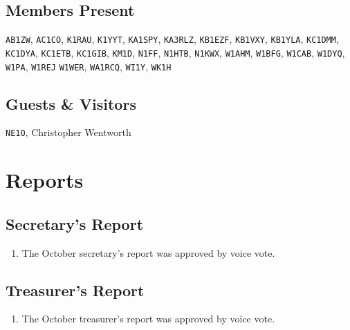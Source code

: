 \documentclass[10pt,letterpaper]{article}
\begin{document}
\subsection{Members Present}
\texttt{AB1ZW},
\texttt{AC1CO},
\texttt{K1RAU},
\texttt{K1YYT},
\texttt{KA1SPY},
\texttt{KA3RLZ},
\texttt{KB1EZF},
\texttt{KB1VXY},
\texttt{KB1YLA},
\texttt{KC1DMM},
\texttt{KC1DYA},
\texttt{KC1ETB},
\texttt{KC1GIB},
\texttt{KM1D},
\texttt{N1FF},
\texttt{N1HTB},
\texttt{N1KWX},
\texttt{W1AHM},
\texttt{W1BFG},
\texttt{W1CAB},
\texttt{W1DYQ},
\texttt{W1PA},
\texttt{W1REJ}
\texttt{W1WER},
\texttt{WA1RCQ},
\texttt{WI1Y},
\texttt{WK1H}

\subsection{Guests \& Visitors}
\texttt{NE1O},
Christopher Wentworth


\section{Reports}

\subsection{Secretary's Report}
\begin{enumerate}
  \item The October secretary's report was approved by voice vote.
\end{enumerate}

\newpage
\subsection{Treasurer's Report}
\begin{enumerate}
  \item The October treasurer's report was approved by voice vote.
\end{enumerate}
\end{document}
